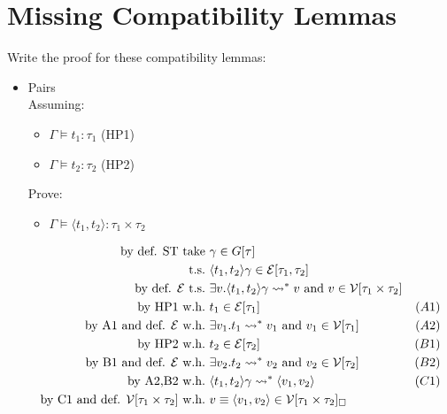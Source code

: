 \documentclass{article}
\begin{document}
\section{Missing Compatibility Lemmas}
Write the proof for these compatibility lemmas:
\begin{itemize}
    \item Pairs \\
        Assuming: \begin{itemize}
            \item $\Gamma \vDash t_1:\tau_1$ (HP1)
            \item $\Gamma \vDash t_2:\tau_2$ (HP2)
        \end{itemize}
        Prove: \begin{itemize}
            \item $\Gamma \vDash \langle t_1,t_2 \rangle : \tau_1\times\tau_2$
        \end{itemize}
        \begin{align*}
            \text{by def. ST take} &\ \gamma \in G[\tau] \\
            \text{t.s.} &\ \pair{t_1,t_2}\gamma\in\cE[\tau_1,\tau_2] \\
            \text{by def. $\cE$ t.s.} &\ \exists v.\pair{t_1,t_2}\gamma\leadsto^{*}v\AND v\in\V[\tau_1\times\tau_2] \\
            \text{by HP1 w.h.} &\ t_1\in\cE[\tau_1] & (A1) \\
            \text{by A1 and def. $\cE$ w.h.} &\ \exists v_1.t_1 \leadsto^{*}v_1\AND v_1\in\V[\tau_1] & (A2) \\
            \text{by HP2 w.h.} &\ t_2\in\cE[\tau_2] & (B1) \\
            \text{by B1 and def. $\cE$ w.h.} &\ \exists v_2.t_2 \leadsto^{*}v_2\AND v_2\in\V[\tau_2] & (B2) \\
            \text{by A2,B2 w.h.} &\ \pair{t_1,t_2}\gamma \leadsto^{*}\pair{v_1,v_2} & (C1) \\
            \text{by C1 and def. $\V[\tau_1\times\tau_2]$ w.h.} &\ v\equiv\pair{v_1,v_2}\in\V[\tau_1\times\tau_2]_\square
        \end{align*}


\end{itemize}
\end{document}
